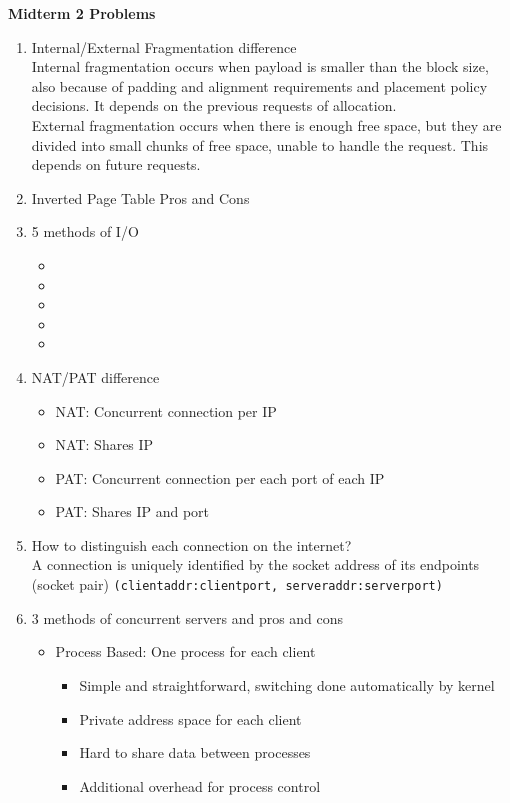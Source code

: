 \documentclass[12pt]{article}
\newcommand{\cname}[1]{\large \textbf{#1}}
\begin{document}
{\pagebreak
\cname{Midterm 2 Problems}
\begin{enumerate}
	\item Internal/External Fragmentation difference\\
	Internal fragmentation occurs when payload is smaller than the block size, also because of padding and alignment requirements and placement policy decisions. It depends on the previous requests of allocation.\\
	External fragmentation occurs when there is enough free space, but they are divided into small chunks of free space, unable to handle the request. This depends on future requests.
	\item Inverted Page Table Pros and Cons
	\item 5 methods of I/O
	\begin{itemize}
		\item 
		\item 
		\item 
		\item 
		\item 
	\end{itemize}
	\item NAT/PAT difference
	\begin{itemize}
		\item NAT: Concurrent connection per IP
		\item NAT: Shares IP
		\item PAT: Concurrent connection per each port of each IP
		\item PAT: Shares IP and port
	\end{itemize}
	\item How to distinguish each connection on the internet?\\
	A connection is uniquely identified by the socket address of its endpoints (socket
	pair) \texttt{(clientaddr:clientport, serveraddr:serverport)}
	\item 3 methods of concurrent servers and pros and cons
	\begin{itemize}
		\item Process Based: One process for each client
		\begin{itemize}
			\item Simple and straightforward, switching done automatically by kernel
			\item Private address space for each client
			\item Hard to share data between processes
			\item Additional overhead for process control

\end{itemize}
\end{itemize}
\end{enumerate}}
\end{document}
